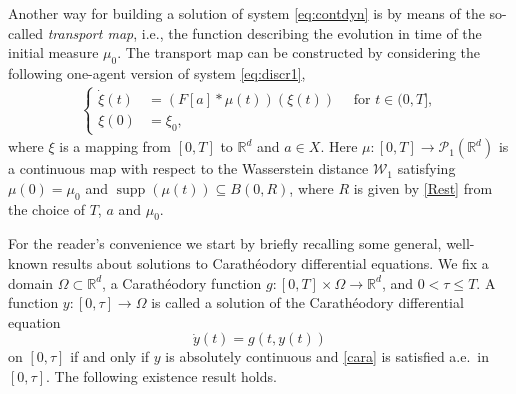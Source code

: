 \documentclass[A4paper,11pt]{article}
\newtheorem{theorem}{Theorem}[section]
\theoremstyle{definition}
\newcommand{\R}{\mathbb{R}}
\newcommand{\W}{\mathcal{W}}
\newcommand{\PP}{\mathcal{P}_1}
\DeclareMathOperator{\supp}{supp}
\begin{document}
Another way for building a solution of system \eqref{eq:contdyn} is by means of the so-called \textit{transport map}, i.e., the function describing the evolution in time of the initial measure $\mu_0$. The transport map can be constructed by considering the following one-agent version of system \eqref{eq:discr1},
\begin{align}\label{eq:transpdyn}
\left\{\begin{aligned}
\dot{\xi}(t) &= (F[a]*\mu(t))(\xi(t)) \quad \text{ for } t \in (0,T],\\
\xi(0) &= \xi_0,
\end{aligned}\right.
\end{align}
where $\xi$ is a mapping from $[0,T]$ to $\R^d$ and $a \in X$. Here $\mu:[0,T]\rightarrow\PP(\R^d)$ is a continuous map with respect to the Wasserstein distance $\W_1$ satisfying $\mu(0) = \mu_0$ and $\supp(\mu(t)) \subseteq B(0,R)$, where $R$ is given by \eqref{Rest} from the choice of $T$, $a$ and $\mu_0$.

For the reader's convenience we start by briefly recalling some general, well-known results about solutions to Carath{\'e}odory differential equations. We fix a domain $\Omega \subset \R^d$, a Carath{\'e}odory function $g\colon[0,T]\times \Omega \to \R^d$, and $0<\tau \le T$. A function $y\colon [0,\tau]\to \Omega$ is called a solution of the Carath{\'e}odory differential equation
\begin{equation}\label{cara}
\dot y(t)=g(t, y(t))
\end{equation}
on $[0,\tau]$ if and only if $y$ is absolutely continuous and \eqref{cara} is satisfied a.e.\ in $[0,\tau]$.
The following existence result holds.
%
%
%
\end{document}
